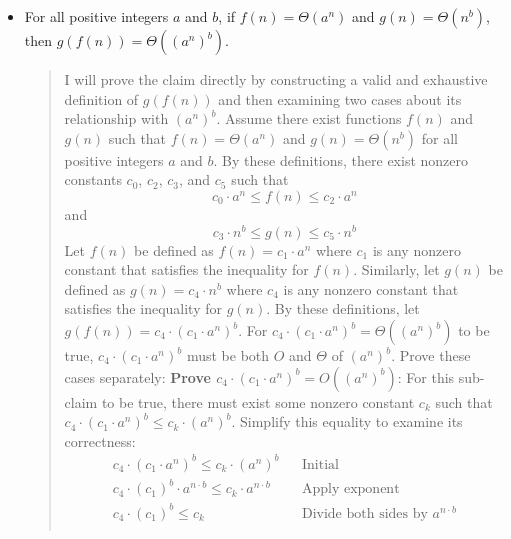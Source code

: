 \documentclass[11pt]{article}
\begin{document}
\begin{enumerate}
\begin{enumerate}
\begin{itemize}
\begin{quote}
        \end{quote}
        \item For all positive integers $a$ and $b$, if $f(n) = \Theta(a^n)$ and $g(n) = \Theta(n^b)$, then $g(f(n)) = \Theta((a^n)^b)$.
        \begin{quote}
            \color{purple}
            I will prove the claim directly by constructing a valid and exhaustive definition of $g(f(n))$ and then examining two cases about its relationship with $(a^n)^b$. \newline 
            Assume there exist functions $f(n)$ and $g(n)$ such that $f(n) = \Theta(a^n)$ and $g(n) = \Theta(n^b)$ for all positive integers $a$ and $b$. \newline
            By these definitions, there exist nonzero constants $c_0$, $c_2$, $c_3$, and $c_5$ such that 
            $$c_0 \cdot a^n \leq f(n) \leq c_2 \cdot a^n$$
            and
            $$c_3 \cdot n^b \leq g(n) \leq c_5 \cdot n^b$$
            Let $f(n)$ be defined as $f(n) = c_1 \cdot a^n$ where $c_1$ is any nonzero constant that satisfies the inequality for $f(n)$. \newline 
            Similarly, let $g(n)$ be defined as $g(n) = c_4 \cdot n^b$ where $c_4$ is any nonzero constant that satisfies the inequality for $g(n)$. \newline
            By these definitions, let $g(f(n)) = c_4 \cdot (c_1 \cdot a^n)^b$. For $c_4 \cdot (c_1 \cdot a^n)^b = \Theta((a^n)^b)$ to be true, $c_4 \cdot (c_1 \cdot a^n)^b$ must be both $O$ and $\Theta$ of $(a^n)^b$. Prove these cases separately: \newline
            \newline 
            \textbf{Prove $c_4 \cdot (c_1 \cdot a^n)^b = O((a^n)^b)$}: \newline
            For this sub-claim to be true, there must exist some nonzero constant $c_k$ such that $c_4 \cdot (c_1 \cdot a^n)^b \leq c_k \cdot (a^n)^b$. Simplify this equality to examine its correctness:
            \begin{align*}
                && c_4 \cdot (c_1 \cdot a^n)^b \leq c_k \cdot (a^n)^b && \text{Initial} && \\
                && c_4 \cdot (c_1)^b \cdot a^{n \cdot b} \leq c_k \cdot a^{n \cdot b} && \text{Apply exponent} && \\
                && c_4 \cdot (c_1)^b \leq c_k && \text{Divide both sides by $a^{n \cdot b}$} && \\
            \end{align*}

\end{quote}
\end{itemize}
\end{enumerate}
\end{enumerate}
\end{document}
